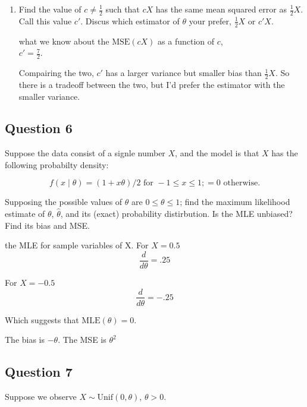 \documentclass{tufte-book}
\newcommand{\MSE}{\mathrm{MSE}}
\newcommand{\MLE}{\mathrm{MLE}}
\theoremstyle{mytheoremstyle}
\theoremstyle{mylemstyle}
\theoremstyle{mydefstyle}
\begin{document}
\begin{enumerate}
\item Find the value of $c \neq \frac{1}{2}$ such that $cX$ has the same mean squared error as $\frac{1}{2}X$.  Call this value $c'$.  Discus which estimator of $\theta$ your prefer, $\frac{1}{2}X$ or $c'X$.

 what we know about the $\MSE(cX)$ as a function of $c$,\\
 $c'=\frac{7}{2}$.

Compairing the two, $c'$ has a larger variance but smaller bias than $\frac{1}{2}X$.  So there is a tradeoff between the two, but I'd prefer the estimator with the smaller variance.

\end{enumerate}


\subsection{Question 6}
Suppose the data consist of a signle number $X$, and the model is that $X$ has the following probabilty density:

\[ f(x \mid \theta) = (1+x\theta)/2 \text{ for } -1 \leq x \leq 1;=0 \text{ otherwise.} \]

Supposing the possible values of $\theta$ are $0 \leq \theta \leq 1$; find the maximum likelihood estimate of $\theta$, $\hat{\theta}$, and its (exact) probability distirbution.  Is the MLE unbiased?  Find its bias and MSE.

 the MLE for sample variables of X.
For $X=0.5$
\[ \frac{d}{d\theta} = .25 \]

For $X=-0.5$
\[ \frac{d}{d\theta} = -.25 \]

Which suggests that $\MLE(\theta) = 0$.

The bias is $-\theta$.  The MSE is $\theta^2$


\subsection{Question 7}
Suppose we observe $X \sim \text{Unif}(0,\theta)$, $\theta > 0$.
\end{document}
